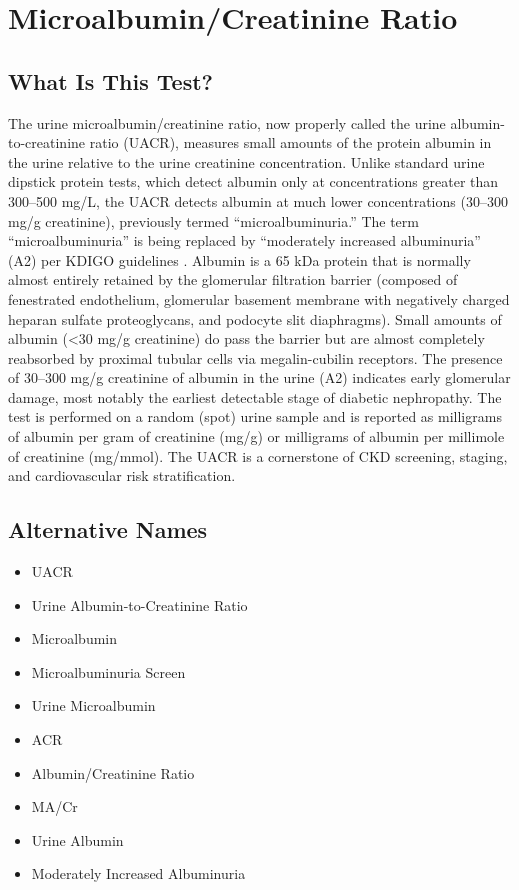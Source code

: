 \chapter{Microalbumin/Creatinine Ratio}

\section*{What Is This Test?}
The urine microalbumin/creatinine ratio, now properly called the urine albumin-to-creatinine ratio (UACR), measures small amounts of the protein albumin in the urine relative to the urine creatinine concentration. Unlike standard urine dipstick protein tests, which detect albumin only at concentrations greater than 300--500 mg/L, the UACR detects albumin at much lower concentrations (30--300 mg/g creatinine), previously termed ``microalbuminuria.'' The term ``microalbuminuria'' is being replaced by ``moderately increased albuminuria'' (A2) per KDIGO guidelines \cite{kdigo2012clinical}. Albumin is a 65 kDa protein that is normally almost entirely retained by the glomerular filtration barrier (composed of fenestrated endothelium, glomerular basement membrane with negatively charged heparan sulfate proteoglycans, and podocyte slit diaphragms). Small amounts of albumin (<30 mg/g creatinine) do pass the barrier but are almost completely reabsorbed by proximal tubular cells via megalin-cubilin receptors. The presence of 30--300 mg/g creatinine of albumin in the urine (A2) indicates early glomerular damage, most notably the earliest detectable stage of diabetic nephropathy. The test is performed on a random (spot) urine sample and is reported as milligrams of albumin per gram of creatinine (mg/g) or milligrams of albumin per millimole of creatinine (mg/mmol). The UACR is a cornerstone of CKD screening, staging, and cardiovascular risk stratification.

\section*{Alternative Names}
\begin{itemize}
  \item UACR
  \item Urine Albumin-to-Creatinine Ratio
  \item Microalbumin
  \item Microalbuminuria Screen
  \item Urine Microalbumin
  \item ACR
  \item Albumin/Creatinine Ratio
  \item MA/Cr
  \item Urine Albumin
  \item Moderately Increased Albuminuria
\end{itemize}

